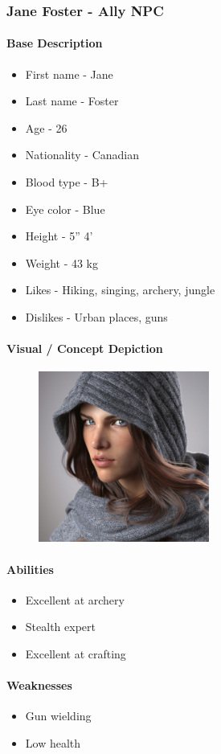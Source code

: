 \subsubsection{Jane Foster - Ally NPC}
	\paragraph{Base Description}\mbox{}
		\begin{itemize}
			\item First name - Jane
			\item Last name - Foster
			\item Age - 26
			\item Nationality - Canadian
			\item Blood type - B+
			\item Eye color - Blue
			\item Height - 5” 4’
			\item Weight - 43 kg
			\item Likes - Hiking, singing, archery, jungle
			\item Dislikes - Urban places, guns
		\end{itemize}
	\paragraph{Visual / Concept Depiction}\mbox{}
		\begin{figure}[H]
			\centering
			\includegraphics[width=0.5\textwidth]{images/characters/jane}
		\end{figure}
	\paragraph{Abilities}\mbox{}
		\begin{itemize}
			\item Excellent at archery
			\item Stealth expert
			\item Excellent at crafting
		\end{itemize}
	\paragraph{Weaknesses}\mbox{}
		\begin{itemize}
			\item Gun wielding
			\item Low health
        \end{itemize}